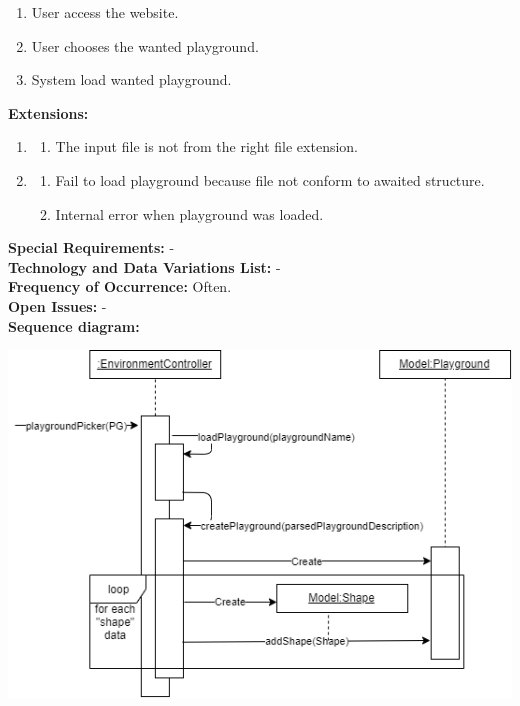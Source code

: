 \documentclass{scrbook}
\begin{document}
\begin{enumerate}
  \item User access the website.
  \item User chooses the wanted playground.
  \item System load wanted playground.
\end{enumerate}
\textbf{Extensions: }
\begin{enumerate}\addtocounter{enumi}{1}
  \item 
  \begin{enumerate}
    \item The input file is not from the right file extension. 
  \end{enumerate}
  \item 
  \begin{enumerate}
    \item Fail to load playground because file not conform to awaited structure.
    \item Internal error when playground was loaded.
  \end{enumerate}
\end{enumerate}
\textbf{Special Requirements: }- \\
\textbf{Technology and Data Variations List: }- \\
\textbf{Frequency of Occurrence: }Often. \\
\textbf{Open Issues: }- \\
\textbf{Sequence diagram: } \\
\begin{center}
  \includegraphics[scale=0.7]{./loadPlayground_sd}
\end{center}
\end{document}
